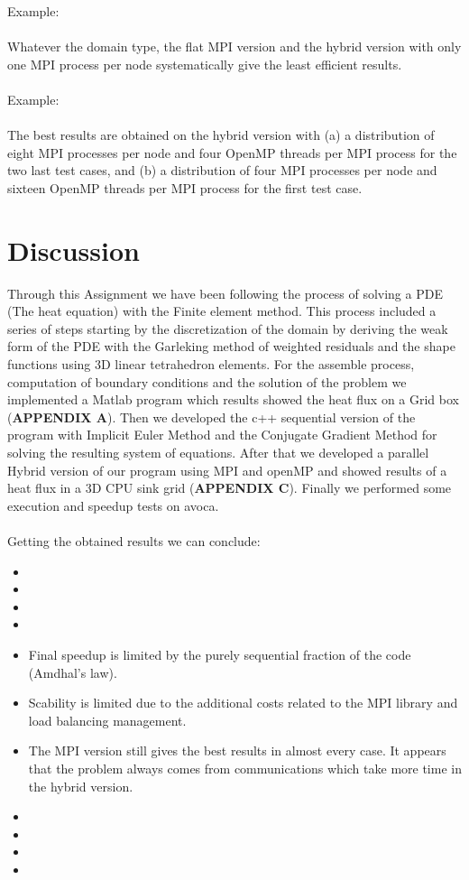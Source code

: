 \documentclass[12pt]{article}
\begin{document}
Example:\\\\
Whatever the domain type, the flat MPI version and the hybrid version with only
one MPI process per node systematically give the least efficient results.
\\\\
Example:\\\\
The best results are obtained on the hybrid version with (a) a distribution of eight
MPI processes per node and four OpenMP threads per MPI process for the two
last test cases, and (b) a distribution of four MPI processes per node and sixteen
OpenMP threads per MPI process for the first test case.	
	
	\section{Discussion}

Through this Assignment we have been following the process of solving a PDE (The heat equation) with the Finite element method. This process included a series of steps starting by the discretization of the domain by deriving the weak form of the PDE with the Garleking method of weighted residuals and the shape functions using 3D linear tetrahedron elements. For the assemble process, computation of boundary conditions and the solution of the problem we implemented a Matlab program which results showed the heat flux on a Grid box (\textbf{APPENDIX A}). Then we developed the c++ sequential version of the program with Implicit Euler Method and the Conjugate Gradient Method for solving the resulting system of equations. After that we developed a parallel Hybrid version of our program using MPI and openMP and showed results of a heat flux in a 3D CPU sink grid (\textbf{APPENDIX C}). Finally we performed some execution and speedup tests on avoca.
\\\\
Getting the obtained results we can conclude:

\begin{itemize}
  \item 
  \item
  \item
  \item  
  \item Final speedup is limited by the purely sequential fraction of the code (Amdhal’s law).
  \item Scability is limited due to the additional costs related to the MPI library and load
balancing management.
  \item The MPI version still gives the best results in almost every case.
It appears that the problem always comes from communications which take more
time in the hybrid version.
  \item
  \item
  \item
  \item
\end{itemize}
\end{document}
